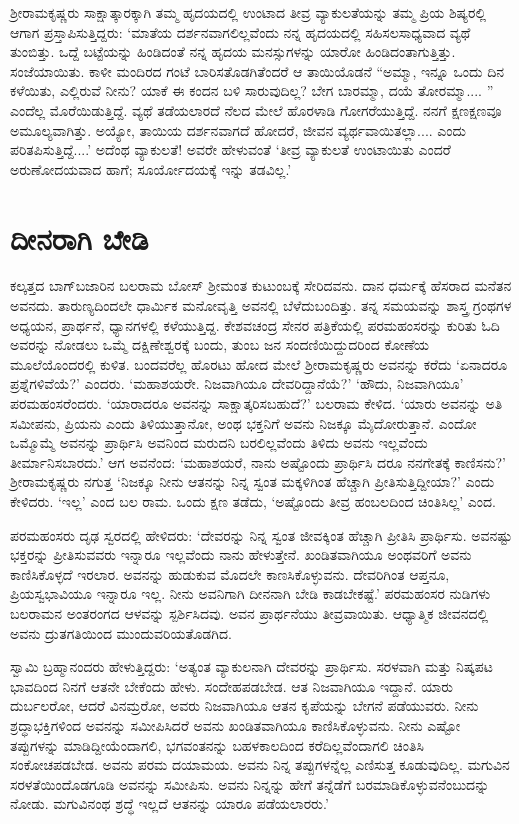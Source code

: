 ಶ‍್ರೀರಾಮಕೃಷ್ಣರು ಸಾಕ್ಷಾತ್ಕಾರಕ್ಕಾಗಿ ತಮ್ಮ ಹೃದಯದಲ್ಲಿ ಉಂಟಾದ ತೀವ್ರ ವ್ಯಾಕುಲತೆಯನ್ನು ತಮ್ಮ ಪ್ರಿಯ ಶಿಷ್ಯರಲ್ಲಿ ಆಗಾಗ ಪ್ರಸ್ತಾಪಿಸುತ್ತಿದ್ದರು: ‘ಮಾತೆಯ ದರ್ಶನವಾಗಲಿಲ್ಲವೆಂದು ನನ್ನ ಹೃದಯದಲ್ಲಿ ಸಹಿಸಲಸಾಧ್ಯವಾದ ವ್ಯಥೆ ತುಂಬಿತ್ತು. ಒದ್ದೆ ಬಟ್ಟೆಯನ್ನು ಹಿಂಡಿದಂತೆ ನನ್ನ ಹೃದಯ ಮನಸ್ಸುಗಳನ್ನು ಯಾರೋ ಹಿಂಡಿದಂತಾಗುತ್ತಿತ್ತು. ಸಂಜೆಯಾಯಿತು. ಕಾಳೀ ಮಂದಿರದ ಗಂಟೆ ಬಾರಿಸತೊಡಗಿತೆಂದರೆ ಆ ತಾಯಿಯೊಡನೆ “ಅಮ್ಮಾ, ಇನ್ನೂ ಒಂದು ದಿನ ಕಳೆಯಿತು, ಎಲ್ಲಿರುವೆ ನೀನು? ಯಾಕೆ ಈ ಕಂದನ ಬಳಿ ಸಾರುವುದಿಲ್ಲ? ಬೇಗ ಬಾರಮ್ಮಾ, ದಯೆ ತೋರಮ್ಮಾ.... ” ಎಂದೆಲ್ಲ ಮೊರೆಯಿಡುತ್ತಿದ್ದೆ. ವ್ಯಥೆ ತಡೆಯಲಾರದೆ ನೆಲದ ಮೇಲೆ ಹೊರಳಾಡಿ ಗೋಗರೆಯುತ್ತಿದ್ದೆ. ನನಗೆ ಕ್ಷಣಕ್ಷಣವೂ ಅಮೂಲ್ಯವಾಗಿತ್ತು. ಅಯ್ಯೋ, ತಾಯಿಯ ದರ್ಶನವಾಗದೆ ಹೋದರೆ, ಜೀವನ ವ್ಯರ್ಥವಾಯಿತಲ್ಲಾ.... ಎಂದು ಪರಿತಪಿಸುತ್ತಿದ್ದೆ....’ ಅದೆಂಥ ವ್ಯಾಕುಲತೆ! ಅವರೇ ಹೇಳುವಂತೆ ‘ತೀವ್ರ ವ್ಯಾಕುಲತೆ ಉಂಟಾಯಿತು ಎಂದರೆ ಅರುಣೋದಯವಾದ ಹಾಗೆ; ಸೂರ್ಯೋದಯಕ್ಕೆ ಇನ್ನು ತಡವಿಲ್ಲ.’


\section{ದೀನರಾಗಿ ಬೇಡಿ}

ಕಲ್ಕತ್ತದ ಬಾಗ್​ಬಜಾರಿನ ಬಲರಾಮ ಬೋಸ್ ಶ‍್ರೀಮಂತ ಕುಟುಂಬಕ್ಕೆ ಸೇರಿದವನು. ದಾನ ಧರ್ಮಕ್ಕೆ ಹೆಸರಾದ ಮನೆತನ ಅವನದು. ತಾರುಣ್ಯದಿಂದಲೇ ಧಾರ್ಮಿಕ ಮನೋವೃತ್ತಿ ಅವನಲ್ಲಿ ಬೆಳೆದುಬಂದಿತ್ತು. ತನ್ನ ಸಮಯವನ್ನು ಶಾಸ್ತ್ರ ಗ್ರಂಥಗಳ ಅಧ್ಯಯನ, ಪ್ರಾರ್ಥನೆ, ಧ್ಯಾನಗಳಲ್ಲಿ ಕಳೆಯುತ್ತಿದ್ದ. ಕೇಶವಚಂದ್ರ ಸೇನರ ಪತ್ರಿಕೆಯಲ್ಲಿ ಪರಮಹಂಸರನ್ನು ಕುರಿತು ಓದಿ ಅವರನ್ನು ನೋಡಲು ಒಮ್ಮೆ ದಕ್ಷಿಣೇಶ್ವರಕ್ಕೆ ಬಂದು, ತುಂಬ ಜನ ಸಂದಣಿಯಿದ್ದುದರಿಂದ ಕೋಣೆಯ ಮೂಲೆಯೊಂದರಲ್ಲಿ ಕುಳಿತ. ಬಂದವರೆಲ್ಲ ಹೊರಟು ಹೋದ ಮೇಲೆ ಶ‍್ರೀರಾಮಕೃಷ್ಣರು ಅವನನ್ನು ಕರೆದು ‘ಏನಾದರೂ ಪ್ರಶ್ನೆಗಳಿವೆಯೆ?’ ಎಂದರು. ‘ಮಹಾಶಯರೇ. ನಿಜವಾಗಿಯೂ ದೇವರಿದ್ದಾನೆಯೆ?’ ‘ಹೌದು, ನಿಜವಾಗಿಯೂ’ ಪರಮಹಂಸರೆಂದರು. ‘ಯಾರಾದರೂ ಅವನನ್ನು ಸಾಕ್ಷಾತ್ಕರಿಸಬಹುದೆ?’ ಬಲರಾಮ ಕೇಳಿದ. ‘ಯಾರು ಅವನನ್ನು ಅತಿ ಸಮೀಪನು, ಪ್ರಿಯನು ಎಂದು ತಿಳಿಯುತ್ತಾನೋ, ಅಂಥ ಭಕ್ತನಿಗೆ ಅವನು ನಿಜಕ್ಕೂ ಮೈದೋರುತ್ತಾನೆ. ಎಂದೋ ಒಮ್ಮೊಮ್ಮೆ ಅವನನ್ನು ಪ್ರಾರ್ಥಿಸಿ ಅವನಿಂದ ಮರುದನಿ ಬರಲಿಲ್ಲವೆಂದು ತಿಳಿದು ಅವನು ಇಲ್ಲವೆಂದು ತೀರ್ಮಾನಿಸಬಾರದು.’ ಆಗ ಅವನೆಂದ: ‘ಮಹಾಶಯರೆ, ನಾನು ಅಷ್ಟೊಂದು ಪ್ರಾರ್ಥಿಸಿ ದರೂ ನನಗೇತಕ್ಕೆ ಕಾಣಿಸನು?’ ಶ‍್ರೀರಾಮಕೃಷ್ಣರು ನಗುತ್ತ ‘ನಿಜಕ್ಕೂ ನೀನು ಆತನನ್ನು ನಿನ್ನ ಸ್ವಂತ ಮಕ್ಕಳಿಗಿಂತ ಹೆಚ್ಚಾಗಿ ಪ್ರೀತಿಸುತ್ತಿದ್ದೀಯಾ?’ ಎಂದು ಕೇಳಿದರು. ‘ಇಲ್ಲ’ ಎಂದ ಬಲ ರಾಮ. ಒಂದು ಕ್ಷಣ ತಡೆದು, ‘ಅಷ್ಟೊಂದು ತೀವ್ರ ಹಂಬಲದಿಂದ ಚಿಂತಿಸಿಲ್ಲ’ ಎಂದ.

ಪರಮಹಂಸರು ದೃಢ ಸ್ವರದಲ್ಲಿ ಹೇಳಿದರು: ‘ದೇವರನ್ನು ನಿನ್ನ ಸ್ವಂತ ಜೀವಕ್ಕಿಂತ ಹೆಚ್ಚಾಗಿ ಪ್ರೀತಿಸಿ ಪ್ರಾರ್ಥಿಸು. ಅವನಷ್ಟು ಭಕ್ತರನ್ನು ಪ್ರೀತಿಸುವವರು ಇನ್ನಾರೂ ಇಲ್ಲವೆಂದು ನಾನು ಹೇಳುತ್ತೇನೆ. ಖಂಡಿತವಾಗಿಯೂ ಅಂಥವರಿಗೆ ಅವನು ಕಾಣಿಸಿಕೊಳ್ಳದೆ ಇರಲಾರ. ಅವನನ್ನು ಹುಡುಕುವ ಮೊದಲೇ ಕಾಣಸಿಕೊಳ್ಳುವನು. ದೇವರಿಗಿಂತ ಆಪ್ತನೂ, ಪ್ರಿಯಸ್ವಭಾವಿಯೂ ಇನ್ನಾರೂ ಇಲ್ಲ. ನೀನು ಅವನಿಗಾಗಿ ದೀನನಾಗಿ ಬೇಡಿ ಕಾಡಬೇಕಷ್ಟೆ.’ ಪರಮಹಂಸರ ನುಡಿಗಳು ಬಲರಾಮನ ಅಂತರಂಗದ ಆಳವನ್ನು ಸ್ಪರ್ಶಿಸಿದವು. ಅವನ ಪ್ರಾರ್ಥನೆಯು ತೀವ್ರವಾಯಿತು. ಆಧ್ಯಾತ್ಮಿಕ ಜೀವನದಲ್ಲಿ ಅವನು ದ್ರುತಗತಿಯಿಂದ ಮುಂದುವರಿಯತೊಡಗಿದ.

ಸ್ವಾಮಿ ಬ್ರಹ್ಮಾನಂದರು ಹೇಳುತ್ತಿದ್ದರು: ‘ಅತ್ಯಂತ ವ್ಯಾಕುಲನಾಗಿ ದೇವರನ್ನು ಪ್ರಾರ್ಥಿಸು. ಸರಳವಾಗಿ ಮತ್ತು ನಿಷ್ಕಪಟ ಭಾವದಿಂದ ನಿನಗೆ ಆತನೇ ಬೇಕೆಂದು ಹೇಳು. ಸಂದೇಹಪಡಬೇಡ. ಆತ ನಿಜವಾಗಿಯೂ ಇದ್ದಾನೆ. ಯಾರು ದುರ್ಬಲರೋ, ಆದರೆ ವಿನಮ್ರರೋ, ಅವರು ನಿಜವಾಗಿಯೂ ಆತನ ಕೃಪೆಯನ್ನು ಬೇಗನೆ ಪಡೆಯುವರು. ನೀನು ಶ್ರದ್ಧಾಭಕ್ತಿಗಳಿಂದ ಅವನನ್ನು ಸಮೀಪಿಸಿದರೆ ಅವನು ಖಂಡಿತವಾಗಿಯೂ ಕಾಣಿಸಿಕೊಳ್ಳುವನು. ನೀನು ಎಷ್ಟೋ ತಪ್ಪುಗಳನ್ನು ಮಾಡಿದ್ದೀಯೆಂದಾಗಲಿ, ಭಗವಂತನನ್ನು ಬಹಳಕಾಲದಿಂದ ಕರೆದಿಲ್ಲವೆಂದಾಗಲಿ ಚಿಂತಿಸಿ ಸಂಕೋಚಪಡಬೇಡ. ಅವನು ಪರಮ ದಯಾಮಯ. ಅವನು ನಿನ್ನ ತಪ್ಪುಗಳನ್ನೆಲ್ಲ ಎಣಿಸುತ್ತ ಕೂಡುವುದಿಲ್ಲ. ಮಗುವಿನ ಸರಳತೆಯಿಂದೊಡಗೂಡಿ ಅವನನ್ನು ಸಮೀಪಿಸು. ಅವನು ನಿನ್ನನ್ನು ಹೇಗೆ ತನ್ನೆಡೆಗೆ ಬರಮಾಡಿಕೊಳ್ಳುವನೆಂಬುದನ್ನು ನೋಡು. ಮಗುವಿನಂಥ ಶ್ರದ್ಧೆ ಇಲ್ಲದೆ ಆತನನ್ನು ಯಾರೂ ಪಡೆಯಲಾರರು.’


